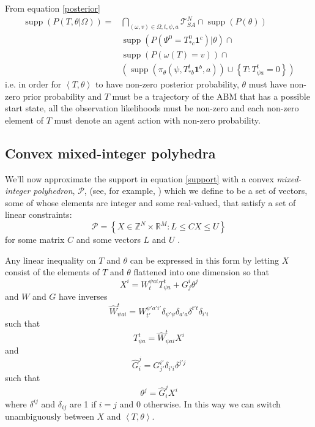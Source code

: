 \documentclass{article}
\DeclareMathOperator\supp{supp}
\begin{document}
From equation \eqref{posterior}
\begin{equation}
\begin{aligned}
\supp (P( T,\theta |\Omega)) = 
& \bigcap_{(\omega,v) \in \Omega,t, \psi, a} \mathcal{T}^N_{SA} \cap \supp(P(\theta)) \\ 
&\supp(P(\Psi^0 = T^0_{* c}\mathbf{1}^c)|\theta) \cap \\
& \supp\left(P\left(\omega(T)=v\right)\right) \cap \\
&\left( \supp\left(\pi_\theta(\psi,T^t_{* b}\mathbf{1}^b,a)\right) \cup \left\{T:T^t_{\psi a} = 0\right\} \right)
\end{aligned}
\label{support}
\end{equation}
i.e. in order for $\left<T,\theta\right>$ to have non-zero posterior probability, $\theta$ must have non-zero prior probability and $T$ must be a trajectory of the ABM that has a possible start state, all the observation likelihoods must be non-zero and each non-zero element of $T$ must denote an agent action with non-zero probability.

\subsection{Convex mixed-integer polyhedra}
\label{BPoly}

We'll now approximate the support in equation \ref{support} with a convex \textit{mixed-integer polyhedron}, $\mathcal{P}$, (see, for example, \citet{conforti2010polyhedral}) which we define to be a set of vectors, some of whose elements are integer and some real-valued, that satisfy a set of linear constraints:
\[
\mathcal{P} = \left\{ X\in\mathbb{Z}^N \times \mathbb{R}^M : L \le  CX \le U \right\}
\]
for some matrix $C$ and some vectors $L$ and $U$ .

Any linear inequality on $T$ and $\theta$ can be expressed in this form by letting $X$ consist of the elements of $T$ and $\theta$ flattened into one dimension so that
\[
X^i = W^{\psi a i}_{t}T^t_{\psi a} + G^i_j\theta^j
\]
and $W$ and $G$ have inverses
\[
\hat{W}^t_{\psi a i} = W^{\psi' a' i'}_{t'}\delta_{\psi'\psi}\delta_{a'a}\delta^{t't}\delta_{i'i}
\]
such that
\[
T^t_{\psi a} = \hat{W}^{t}_{\psi a i}X^i
\]
and
\[
\hat{G}^j_i = G^{i'}_{j'}\delta_{i'i}\delta^{j'j}
\]
such that
\[
\theta^j = \hat{G}^{j}_{i} X^i
\]
where $\delta^{ij}$ and $\delta_{ij}$ are 1 if $i=j$ and 0 otherwise. In this way we can switch unambiguously between $X$ and $\left<T,\theta\right>$.
\end{document}
